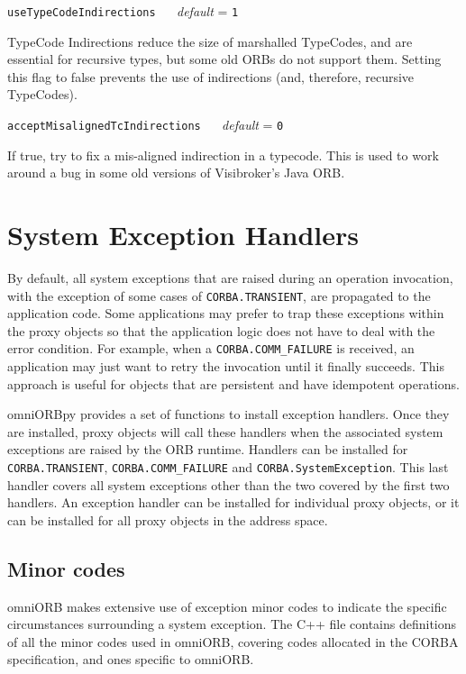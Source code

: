\documentclass[11pt,twoside,a4paper]{book}
\makeatletter
\newcommand{\code}[1]{\texttt{#1}}
\newcommand{\file}{\begingroup \urlstyle{tt}\Url}
\newcommand{\confopt}[2]
  {\vspace{\baselineskip}\par\noindent\code{#1} ~~ \textit{default} =
   \code{#2}}
\renewcommand{\confopt}[2]
  {\vspace{\baselineskip}\par\noindent\code{#1} ~~ \textit{default} =
   \code{#2}\\[-1ex]\@afterheading}
\newcommand{\dsc}{\discretionary{}{}{}}
\makeatother
\begin{document}
\confopt{useTypeCodeIndirections}{1}

TypeCode Indirections reduce the size of marshalled TypeCodes, and are
essential for recursive types, but some old ORBs do not support them.
Setting this flag to false prevents the use of indirections (and,
therefore, recursive TypeCodes).


\confopt{acceptMisalignedTcIndirections}{0}

If true, try to fix a mis-aligned indirection in a typecode. This is
used to work around a bug in some old versions of Visibroker's Java
ORB.


\vspace{2\baselineskip}


\section{System Exception Handlers}
\label{sec:exHandlers}

By default, all system exceptions that are raised during an operation
invocation, with the exception of some cases of
\code{CORBA.TRANSIENT}, are propagated to the application code. Some
applications may prefer to trap these exceptions within the proxy
objects so that the application logic does not have to deal with the
error condition. For example, when a \code{CORBA.COMM\_FAILURE} is
received, an application may just want to retry the invocation until
it finally succeeds. This approach is useful for objects that are
persistent and have idempotent operations.

omniORBpy provides a set of functions to install exception handlers.
Once they are installed, proxy objects will call these handlers when
the associated system exceptions are raised by the ORB runtime.
Handlers can be installed for \code{CORBA.\dsc{}TRANSIENT},
\code{CORBA.COMM\_FAILURE} and \code{CORBA.SystemException}.  This
last handler covers all system exceptions other than the two covered
by the first two handlers. An exception handler can be installed for
individual proxy objects, or it can be installed for all proxy objects
in the address space.


\subsection{Minor codes}

omniORB makes extensive use of exception minor codes to indicate the
specific circumstances surrounding a system exception.  The C++ file
\file{include/omniORB4/minorCode.h} contains definitions of all the
minor codes used in omniORB, covering codes allocated in the CORBA
specification, and ones specific to omniORB.
\end{document}
